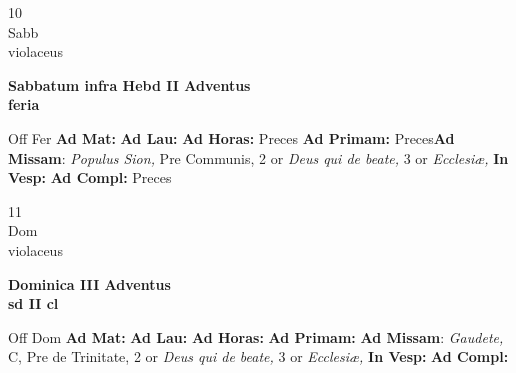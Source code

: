 \documentclass[10pt, openany]{book}
\begin{document}
    \begin{center}
        \begin{minipage}{3.5in}
            \vspace{2em}
            \begin{minipage}{0.5in}
                {\Huge 10} \\
                {\normalsize Sabb} \\
                {\normalsize violaceus}
            \end{minipage}
            \begin{minipage}{3.0in}
                \textbf{ \large Sabbatum infra Hebd II Adventus \\
                \textnormal{\normalsize feria}} \\ 
            \end{minipage}
            \begin{justify}Off Fer
                \textbf{Ad Mat: }
                \textbf{Ad Lau: }
                \textbf{Ad Horas: }Preces
                \textbf{Ad Primam: }Preces\textbf{Ad Missam}: \textit{Populus Sion,} Pre Communis, 2 or \textit{Deus qui de beate,} 3 or \textit{Ecclesiæ,}  
                \textbf{In Vesp: }
                \textbf{Ad Compl: }Preces
            \end{justify}
        \end{minipage}
    \end{center}

    \begin{center}
        \begin{minipage}{3.5in}
            \vspace{2em}
            \begin{minipage}{0.5in}
                {\Huge 11} \\
                {\normalsize Dom} \\
                {\normalsize violaceus}
            \end{minipage}
            \begin{minipage}{3.0in}
                \textbf{ \large Dominica III Adventus \\
                \textnormal{\normalsize sd II cl}} \\ 
            \end{minipage}
            \begin{justify}Off Dom
                \textbf{Ad Mat: }
                \textbf{Ad Lau: }
                \textbf{Ad Horas: }
                \textbf{Ad Primam: }\textbf{Ad Missam}: \textit{Gaudete,} C, Pre de Trinitate, 2 or \textit{Deus qui de beate,} 3 or \textit{Ecclesiæ,}  
                \textbf{In Vesp: }
                \textbf{Ad Compl: }
            \end{justify}
        \end{minipage}
    \end{center}
\end{document}
